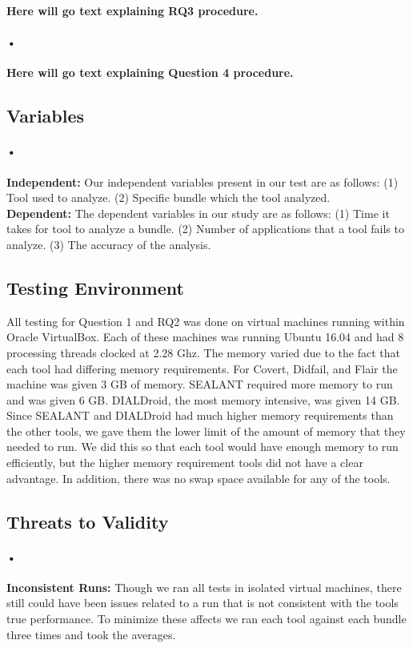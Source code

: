 \documentclass[twocolumn]{article}
\begin{document}
	\textbf{Here will go text explaining RQ3 procedure.}
\paragraph{•}
	\textbf{Here will go text explaining Question 4 procedure.}

\subsection{Variables}
\paragraph{•}
	\textbf{Independent:} Our independent variables present in our test are as follows: (1) Tool used to analyze. (2) Specific bundle which the tool analyzed.\\
	\textbf{Dependent:} The dependent variables in our study are as follows: (1) Time it takes for tool to analyze a bundle. (2) Number of applications that a tool fails to analyze. (3) The accuracy of the analysis.
	
\subsection{Testing Environment}
	All testing for Question 1 and RQ2 was done on virtual machines running within Oracle VirtualBox. Each of these machines was running Ubuntu 16.04 and had 8 processing threads clocked at 2.28 Ghz. The memory varied due to the fact that each tool had differing memory requirements. For Covert, Didfail, and Flair the machine was given 3 GB of memory. SEALANT required more memory to run and was given 6 GB. DIALDroid, the most memory intensive, was given 14 GB. Since SEALANT and DIALDroid had much higher memory requirements than the other tools, we gave them the lower limit of the amount of memory that they needed to run. We did this so that each tool would have enough memory to run efficiently, but the higher memory requirement tools did not have a clear advantage. In addition, there was no swap space available for any of the tools.
	
\subsection{Threats to Validity}
\paragraph{•}
	\textbf{Inconsistent Runs:} Though we ran all tests in isolated virtual machines, there still could have been issues related to a run that is not consistent with the tools true performance. To minimize these affects we ran each tool against each bundle three times and took the averages.
\end{document}
